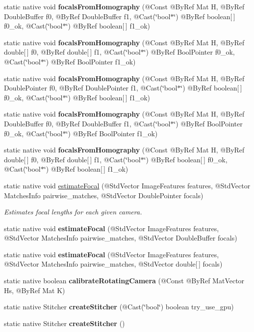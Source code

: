 \begin{DoxyCompactItemize}
\item 
static native void {\bfseries focals\+From\+Homography} (@Const @By\+Ref Mat H, @By\+Ref Double\+Buffer f0, @By\+Ref Double\+Buffer f1, @Cast(\char`\"{}bool$\ast$\char`\"{}) @By\+Ref boolean\mbox{[}$\,$\mbox{]} f0\+\_\+ok, @Cast(\char`\"{}bool$\ast$\char`\"{}) @By\+Ref boolean\mbox{[}$\,$\mbox{]} f1\+\_\+ok)
\item 
static native void {\bfseries focals\+From\+Homography} (@Const @By\+Ref Mat H, @By\+Ref double\mbox{[}$\,$\mbox{]} f0, @By\+Ref double\mbox{[}$\,$\mbox{]} f1, @Cast(\char`\"{}bool$\ast$\char`\"{}) @By\+Ref Bool\+Pointer f0\+\_\+ok, @Cast(\char`\"{}bool$\ast$\char`\"{}) @By\+Ref Bool\+Pointer f1\+\_\+ok)
\item 
static native void {\bfseries focals\+From\+Homography} (@Const @By\+Ref Mat H, @By\+Ref Double\+Pointer f0, @By\+Ref Double\+Pointer f1, @Cast(\char`\"{}bool$\ast$\char`\"{}) @By\+Ref boolean\mbox{[}$\,$\mbox{]} f0\+\_\+ok, @Cast(\char`\"{}bool$\ast$\char`\"{}) @By\+Ref boolean\mbox{[}$\,$\mbox{]} f1\+\_\+ok)
\item 
static native void {\bfseries focals\+From\+Homography} (@Const @By\+Ref Mat H, @By\+Ref Double\+Buffer f0, @By\+Ref Double\+Buffer f1, @Cast(\char`\"{}bool$\ast$\char`\"{}) @By\+Ref Bool\+Pointer f0\+\_\+ok, @Cast(\char`\"{}bool$\ast$\char`\"{}) @By\+Ref Bool\+Pointer f1\+\_\+ok)
\item 
static native void {\bfseries focals\+From\+Homography} (@Const @By\+Ref Mat H, @By\+Ref double\mbox{[}$\,$\mbox{]} f0, @By\+Ref double\mbox{[}$\,$\mbox{]} f1, @Cast(\char`\"{}bool$\ast$\char`\"{}) @By\+Ref boolean\mbox{[}$\,$\mbox{]} f0\+\_\+ok, @Cast(\char`\"{}bool$\ast$\char`\"{}) @By\+Ref boolean\mbox{[}$\,$\mbox{]} f1\+\_\+ok)
\item 
static native void \hyperlink{group__stitching__autocalib_gab7c6c88fc60a136eb6f9faa46a32e660}{estimate\+Focal} (@Std\+Vector Image\+Features features, @Std\+Vector Matches\+Info pairwise\+\_\+matches, @Std\+Vector Double\+Pointer focals)
\begin{DoxyCompactList}\small\item\em Estimates focal lengths for each given camera. \end{DoxyCompactList}\item 
static native void {\bfseries estimate\+Focal} (@Std\+Vector Image\+Features features, @Std\+Vector Matches\+Info pairwise\+\_\+matches, @Std\+Vector Double\+Buffer focals)
\item 
static native void {\bfseries estimate\+Focal} (@Std\+Vector Image\+Features features, @Std\+Vector Matches\+Info pairwise\+\_\+matches, @Std\+Vector double\mbox{[}$\,$\mbox{]} focals)
\item 
static native boolean {\bfseries calibrate\+Rotating\+Camera} (@Const @By\+Ref Mat\+Vector Hs, @By\+Ref Mat K)
\item 
static native Stitcher {\bfseries create\+Stitcher} (@Cast(\char`\"{}bool\char`\"{}) boolean try\+\_\+use\+\_\+gpu)
\item 
static native Stitcher {\bfseries create\+Stitcher} ()
\end{DoxyCompactItemize}
